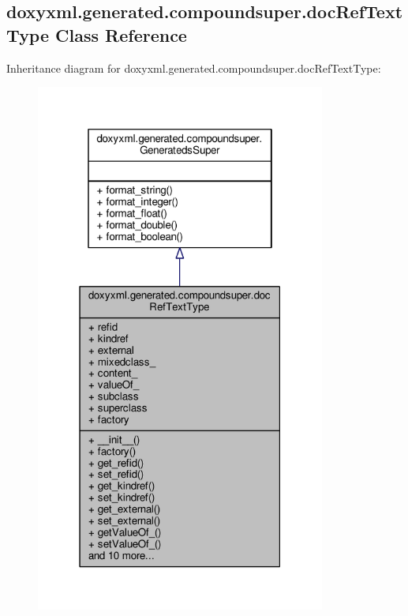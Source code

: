 \subsection{doxyxml.\+generated.\+compoundsuper.\+doc\+Ref\+Text\+Type Class Reference}
\label{classdoxyxml_1_1generated_1_1compoundsuper_1_1docRefTextType}


Inheritance diagram for doxyxml.\+generated.\+compoundsuper.\+doc\+Ref\+Text\+Type\+:
\nopagebreak
\begin{figure}[H]
\begin{center}
\leavevmode
\includegraphics[width=270pt]{d7/d12/classdoxyxml_1_1generated_1_1compoundsuper_1_1docRefTextType__inherit__graph}
\end{center}
\end{figure}


